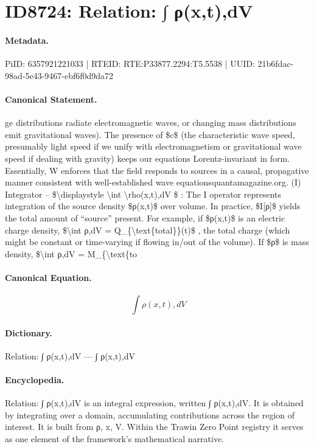 \section*{ID8724: Relation: ∫ ρ(x,t),dV}
\paragraph{Metadata.}
PiID: 6357921221033 | RTEID: RTE:P33877.2294:T5.5538 | UUID: 21b6fdac-98ad-5e43-9467-ebf6f0d9da72

\paragraph{Canonical Statement.}
ge distributions radiate electromagnetic waves, or changing mass distributions emit gravitational waves). The presence of \$c\$ (the characteristic wave speed, presumably light speed if we unify with electromagnetism or gravitational wave speed if dealing with gravity) keeps our equations Lorentz-invariant in form. Essentially, W enforces that the field responds to sources in a causal, propagative manner consistent with well-established wave equationsquantamagazine.org. (I) Integrator – \$\textbackslash{}displaystyle \textbackslash{}int \textbackslash{}rho(x,t),dV \$ : The I operator represents integration of the source density \$ρ(x,t)\$ over volume. In practice, \$I[ρ]\$ yields the total amount of “source” present. For example, if \$ρ(x,t)\$ is an electric charge density, \$\textbackslash{}int ρ,dV = Q\_\{\textbackslash{}text\{total\}\}(t)\$ , the total charge (which might be constant or time-varying if flowing in/out of the volume). If \$ρ\$ is mass density, \$\textbackslash{}int ρ,dV = M\_\{\textbackslash{}text\{to

\paragraph{Canonical Equation.}
\[
\displaystyle \int \rho(x,t),dV
\]

\paragraph{Dictionary.}
Relation: ∫ ρ(x,t),dV — ∫ ρ(x,t),dV

\paragraph{Encyclopedia.}
Relation: ∫ ρ(x,t),dV is an integral expression, written ∫ ρ(x,t),dV. It is obtained by integrating over a domain, accumulating contributions across the region of interest. It is built from ρ, x, V. Within the Trawin Zero Point registry it serves as one element of the framework's mathematical narrative.
